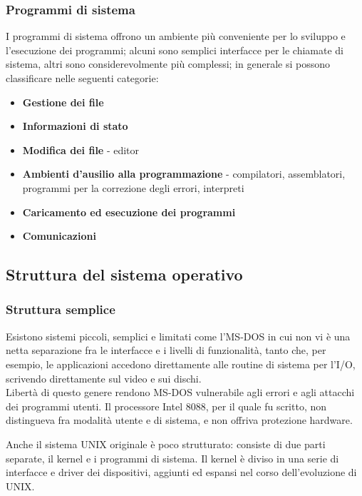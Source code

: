 \documentclass[11pt,a4paper]{article}
\begin{document}
\subsubsection{Programmi di sistema}
I programmi di sistema offrono un ambiente più
conveniente per lo sviluppo e l'esecuzione dei programmi; alcuni sono semplici interfacce
per le chiamate di sistema, altri sono considerevolmente più complessi; in generale si posso­no classificare nelle seguenti categorie:
\begin{itemize}[leftmargin=*]
  \item \textbf{Gestione dei file}
  \item \textbf{Informazioni di stato}
  \item \textbf{Modifica dei file} - editor
  \item \textbf{Ambienti d'ausilio alla programmazione} - compilatori, assemblatori, programmi per
  la correzione degli errori, interpreti
  \item \textbf{Caricamento ed esecuzione dei programmi}
  \item \textbf{Comunicazioni}
\end{itemize}


\subsection{Struttura del sistema operativo}
\subsubsection{Struttura semplice}
Esistono si­stemi piccoli, semplici e limitati come l'MS-DOS in cui non vi è una netta separazione fra le interfacce e i livelli di funzionalità, tan­to che, per esempio, le applicazioni accedono direttamente alle routine di sistema per l'I/O, scrivendo direttamente sul video e sui dischi.\\ Libertà di questo genere rendono MS-DOS vul­nerabile agli errori e agli attacchi dei programmi utenti.
Il processore Intel 8088, per il quale fu scritto, non distingueva fra mo­dalità utente e di sistema, e non offriva protezione hardware.

Anche il sistema UNIX originale è poco strutturato: consiste di due parti separate, il ker­nel e i programmi di sistema. Il kernel è diviso in una serie di interfacce e driver
dei dispositivi, aggiunti ed espansi nel corso dell'evoluzione di UNIX.
\end{document}
